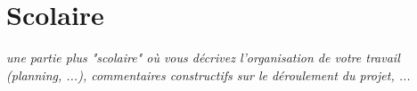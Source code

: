 \documentclass{article}
\begin{document}
\section{Scolaire}
\textit{une partie plus "scolaire" où vous décrivez l'organisation de votre travail (planning, ...), commentaires constructifs sur le déroulement du projet, ...}
\vspace{5mm}
\end{document}
